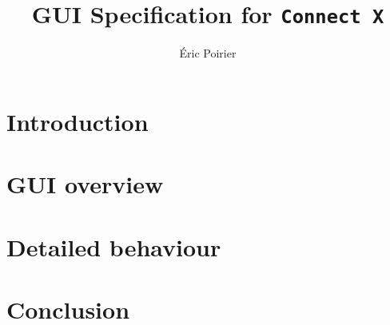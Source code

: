 \documentclass{report}
\newcommand{\files}{./files/}
\begin{document}
\title{GUI Specification for \texttt{Connect X}}
\author{Éric Poirier}
\maketitle


\chapter{Introduction}                         
\chapter{GUI overview}                        
\chapter{Detailed behaviour}                
\chapter{Conclusion}                           




\end{document}
